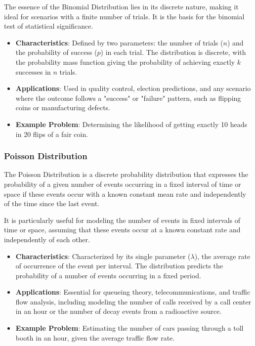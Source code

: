 The essence of the Binomial Distribution lies in its discrete nature, making it ideal for scenarios with a finite number of trials. It is the basis for the binomial test of statistical significance.


\begin{itemize}
    \item \textbf{Characteristics}: Defined by two parameters: the number of trials (\(n\)) and the probability of success (\(p\)) in each trial. The distribution is discrete, with the probability mass function giving the probability of achieving exactly \(k\) successes in \(n\) trials.
    \item \textbf{Applications}: Used in quality control, election predictions, and any scenario where the outcome follows a "success" or "failure" pattern, such as flipping coins or manufacturing defects.
    \item \textbf{Example Problem}: Determining the likelihood of getting exactly 10 heads in 20 flips of a fair coin.
\end{itemize}

\subsubsection*{Poisson Distribution}

The Poisson Distribution is a discrete probability distribution that expresses the probability of a given number of events occurring in a fixed interval of time or space if these events occur with a known constant mean rate and independently of the time since the last event.

It is particularly useful for modeling the number of events in fixed intervals of time or space, assuming that these events occur at a known constant rate and independently of each other.


\begin{itemize}
    \item \textbf{Characteristics}: Characterized by its single parameter (\(\lambda\)), the average rate of occurrence of the event per interval. The distribution predicts the probability of a number of events occurring in a fixed period.
    \item \textbf{Applications}: Essential for queueing theory, telecommunications, and traffic flow analysis, including modeling the number of calls received by a call center in an hour or the number of decay events from a radioactive source.
    \item \textbf{Example Problem}: Estimating the number of cars passing through a toll booth in an hour, given the average traffic flow rate.
\end{itemize}

